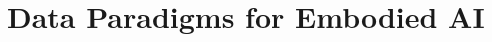 \setcounter{chapter}{33}

\hypertarget{data-paradigms-for-embodied-ai}{%
\chapter{Data Paradigms for Embodied AI}\label{data-paradigms-for-embodied-ai}}
